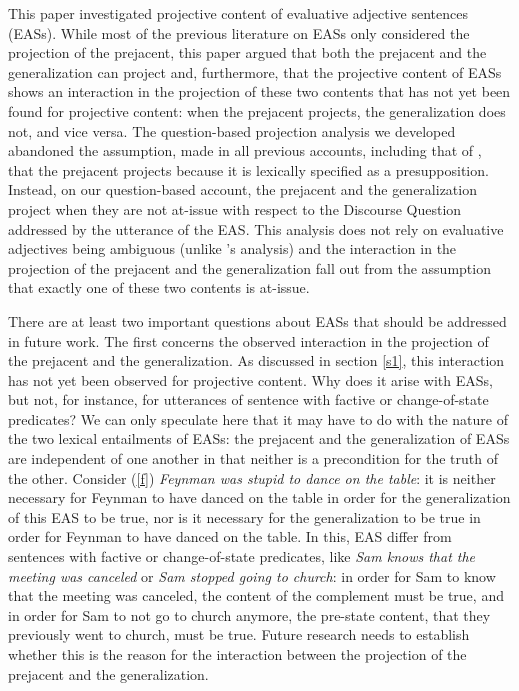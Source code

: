 \documentclass[11pt,fleqn]{article}
\newcommand{\6}{\mbox{$[\hspace*{-.6mm}[$}}
\newcommand{\9}{\mbox{$]\hspace*{-.6mm}]$}}
\newcommand{\citepos}[1]{\citeauthor{#1}'s \citeyear{#1}}
\begin{document}
This paper investigated projective content of evaluative adjective sentences (EASs). While most of the previous literature on EASs only considered the projection of the prejacent, this paper argued that both the prejacent and the generalization can project and, furthermore, that the projective content of EASs shows an interaction in the projection of these two contents that has not yet been found for projective content: when the prejacent projects, the generalization does not, and vice versa. The question-based projection analysis we developed abandoned the assumption, made in all previous accounts, including that of \citealt{karttunen-etal2014}, that the prejacent projects because it is lexically specified as a presupposition. Instead, on our question-based account, the prejacent and the generalization project when they are not at-issue with respect to the Discourse Question addressed by the utterance of the EAS. This analysis does not rely on evaluative adjectives being ambiguous (unlike \citepos{karttunen-etal2014} analysis) and the interaction in the projection of the prejacent and the generalization fall out from the assumption that exactly one of these two contents is at-issue.

There are at least two important questions about EASs that should be addressed in future work. The first concerns the observed interaction in the projection of the prejacent and the generalization. As discussed in section \ref{s1}, this interaction has not yet been observed for projective content. Why does it arise with EASs, but not, for instance, for utterances of sentence with factive or change-of-state predicates? We can only speculate here that it may have to do with the nature of the two lexical entailments of EASs: the prejacent and the generalization of EASs are independent of one another in that neither is a precondition for the truth of the other. Consider (\ref{f}) {\em Feynman was stupid to dance on the table}: it is neither necessary for Feynman to have danced on the table in order for the generalization of this EAS to be true, nor is it necessary for the generalization to be true in order for Feynman to have danced on the table. In this, EAS differ from sentences with factive or change-of-state predicates, like {\em Sam knows that the meeting was canceled} or {\em Sam stopped going to church}: in order for Sam to know that the meeting was canceled, the content of the complement must be true, and in order for Sam to not go to church anymore, the pre-state content, that they previously went to church, must be true. Future research needs to establish whether this is the reason for the interaction between the projection of the prejacent and the generalization.
\end{document}

